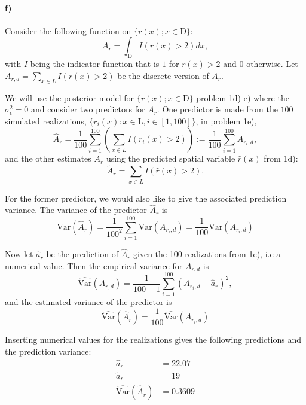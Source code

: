 \paragraph{f)}
Consider the following function on $\{r(x); x \in \text{D}\}$:
\begin{equation}
    A_r = \int_{\text{D}} I(r(x)>2)dx,
\end{equation}
with $I$ being the indicator function that is $1$ for $r(x)>2$ and $0$ otherwise. Let $A_{r,d} = \sum_{x \in L} I(r(x)>2)$ be the discrete version of $A_r$.

We will use the posterior model for $\{r(x); x \in \text{D}\}$ problem 1d)-e) where the $\sigma^2_{\epsilon} = 0$ and consider two predictors for $A_r$. One predictor is made from the $100$ simulated realizations, $\{r_i(x): x \in \text{L}, i \in [1,100]\}$, in problem 1e),
\begin{equation*}
    \hat{A}_r = \frac{1}{100}\sum_{i=1}^{100} \left(\sum_{x \in L} I(r_i(x)>2)\right) := \frac{1}{100}\sum_{i=1}^{100} A_{r_i,d},
\end{equation*}
and the other estimates $A_r$ using the predicted spatial variable $\hat{r}(x)$ from 1d):
\begin{equation*}
    \tilde{A}_r = \sum_{x \in L} I(\hat{r}(x)>2).
\end{equation*}

For the former predictor, we would also like to give the associated prediction variance. The variance of the predictor $\hat{A}_r$ is
\begin{equation*}
    \text{Var}(\hat{A}_{r}) = \frac{1}{100^2}\sum_{i=1}^{100}\text{Var}(A_{r_i,d}) = \frac{1}{100}\text{Var}(A_{r_i,d})
\end{equation*}

Now let $\hat{a}_r$ be the prediction of $\hat{A}_r$ given the 100 realizations from 1e), i.e a numerical value. Then the empirical variance for $A_{r,d}$ is 
\begin{equation*}
    \hat{\text{Var}}(A_{r,d}) = \frac{1}{100-1} \sum_{i=1}^{100}  (A_{r_i,d}-\hat{a}_r)^2, 
\end{equation*}
and the estimated variance of the predictor is 
\begin{equation*}
    \hat{\text{Var}}(\hat{A}_{r}) = \frac{1}{100}\hat{\text{Var}}(A_{r_i,d})
\end{equation*}

Inserting numerical values for the realizations gives the following predictions and the prediction variance:
\begin{align*}
    \hat{a}_r & = 22.07\\
    \tilde{a}_r & = 19\\
    \hat{\text{Var}}(\hat{A}_{r}) & = 0.3609\\
\end{align*}

